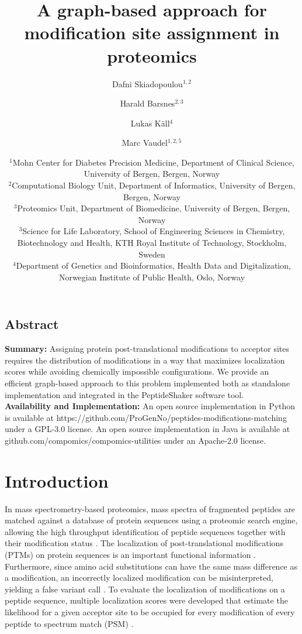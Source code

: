\documentclass[]{article}
\title{A graph-based approach for modification site assignment in proteomics}
\author{Dafni Skiadopoulou$^{1,2}$ \and Harald Barsnes$^{2,3}$ \and Lukas Käll$^{4}$ \and Marc Vaudel$^{1,2,5}$}
\date{%
	$^1$Mohn Center for Diabetes Precision Medicine,
	Department of Clinical Science,
	University of Bergen, Bergen, Norway\\%
	$^2$Computational Biology Unit,
	Department of Informatics,
	University of Bergen, Bergen, Norway\\%
	$^3$Proteomics Unit, 
	Department of Biomedicine, 
	University of Bergen, Bergen, Norway\\%
	$^3$Science for Life Laboratory,
	School of Engineering Sciences in Chemistry, Biotechnology and Health,
	KTH Royal Institute of Technology, Stockholm, Sweden\\
	$^4$Department of Genetics and Bioinformatics, Health Data and Digitalization,
	Norwegian Institute of Public Health, Oslo, Norway\\
}
\begin{document}
	
\maketitle

\subsection*{Abstract} 

\textbf{Summary:} 
	Assigning protein post-translational modifications to acceptor sites requires the distribution of modifications in a way that maximizes localization scores while avoiding chemically impossible configurations. We provide an efficient graph-based approach to this problem implemented both as standalone implementation and integrated in the PeptideShaker software tool. \\
\textbf{Availability and Implementation:} 
	An open source implementation in Python is available at https://github.com/ProGenNo/peptides-modifications-matching under a GPL-3.0 license. An open source implementation in Java is available at github.com/compomics/compomics-utilities under an Apache-2.0 license. \\

\maketitle

\section{Introduction}

In mass spectrometry-based proteomics, mass spectra of fragmented peptides are matched against a database of protein sequences using a proteomic search engine, allowing the high throughput identification of peptide sequences together with their modification status \cite{Mass_spec_proteomics}. The localization of post-translational modifications (PTMs) on protein sequences is an important functional information \cite{Phosphoproteomics}. Furthermore, since amino acid substitutions can have the same mass difference as a modification, an incorrectly localized modification can be misinterpreted, yielding a false variant call \cite{SNPs_PTMs_same_mass}. To evaluate the localization of modifications on a peptide sequence, multiple localization scores were developed that estimate the likelihood for a given acceptor site to be occupied for every modification of every peptide to spectrum match (PSM) \cite{Localization_scoring, computational_phosphoproteomics}.
\end{document}
